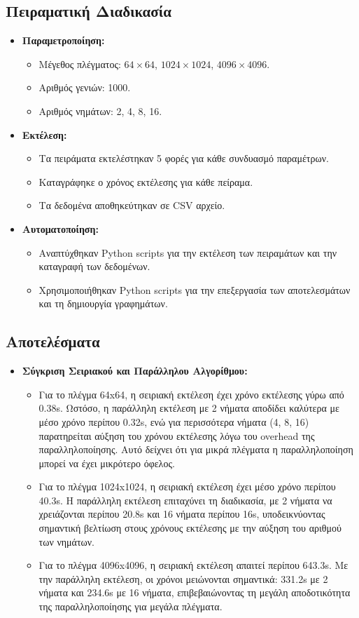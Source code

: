\documentclass{article}
\begin{document}
\subsection*{Πειραματική Διαδικασία}
\begin{itemize}
    \item \textbf{Παραμετροποίηση:}
    \begin{itemize}
        \item Μέγεθος πλέγματος: $64 \times 64$, $1024 \times 1024$, $4096 \times 4096$.
        \item Αριθμός γενιών: 1000.
        \item Αριθμός νημάτων: 2, 4, 8, 16.
    \end{itemize}
    \item \textbf{Εκτέλεση:}
    \begin{itemize}
        \item Τα πειράματα εκτελέστηκαν 5 φορές για κάθε συνδυασμό παραμέτρων.
        \item Καταγράφηκε ο χρόνος εκτέλεσης για κάθε πείραμα.
        \item Τα δεδομένα αποθηκεύτηκαν σε CSV αρχείο.
    \end{itemize}
    \item \textbf{Αυτοματοποίηση:}
    \begin{itemize}
        \item Αναπτύχθηκαν Python scripts για την εκτέλεση των πειραμάτων και την καταγραφή των δεδομένων.
        \item Χρησιμοποιήθηκαν Python scripts για την επεξεργασία των αποτελεσμάτων και τη δημιουργία γραφημάτων.
    \end{itemize}
\end{itemize}
\subsection*{Αποτελέσματα}
\begin{itemize}
    \item \textbf{Σύγκριση Σειριακού και Παράλληλου Αλγορίθμου:}
    \begin{itemize}
        \item Για το πλέγμα 64x64, η σειριακή εκτέλεση έχει χρόνο εκτέλεσης γύρω από 0.38s. Ωστόσο, η παράλληλη εκτέλεση με 2 νήματα αποδίδει καλύτερα με μέσο χρόνο περίπου 0.32s, ενώ για περισσότερα νήματα (4, 8, 16) παρατηρείται αύξηση του χρόνου εκτέλεσης λόγω του overhead της παραλληλοποίησης. Αυτό δείχνει ότι για μικρά πλέγματα η παραλληλοποίηση μπορεί να έχει μικρότερο όφελος.
        \item Για το πλέγμα 1024x1024, η σειριακή εκτέλεση έχει μέσο χρόνο περίπου 40.3s. Η παράλληλη εκτέλεση επιταχύνει τη διαδικασία, με 2 νήματα να χρειάζονται περίπου 20.8s και 16 νήματα περίπου 16s, υποδεικνύοντας σημαντική βελτίωση στους χρόνους εκτέλεσης με την αύξηση του αριθμού των νημάτων.
        \item Για το πλέγμα 4096x4096, η σειριακή εκτέλεση απαιτεί περίπου 643.3s. Με την παράλληλη εκτέλεση, οι χρόνοι μειώνονται σημαντικά: 331.2s με 2 νήματα και 234.6s με 16 νήματα, επιβεβαιώνοντας τη μεγάλη αποδοτικότητα της παραλληλοποίησης για μεγάλα πλέγματα.
    \end{itemize}
\end{itemize}
\end{document}
